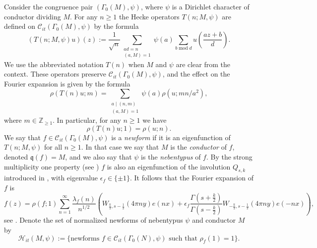 \documentclass{article}
\theoremstyle{named}
\newcommand{\C}{\mathcal{C}}
\newcommand{\HH}{\mathcal{H}}
\newcommand{\Z}{\mathbb{Z}}
\newcommand{\q}{\mathfrak{q}}
\DeclareMathOperator{\modulo}{mod}
\begin{document}
Consider the congruence pair $(\Gamma_0(M), \psi)$, where $\psi$ is a Dirichlet character of conductor dividing $M$. For any $n \geq 1$ the Hecke operators $T(n; M, \psi)$ are defined on $\C_{it}(\Gamma_0(M), \psi)$ by the formula
\begin{equation}\label{eq:Heckeoperatorsexplicitformula}
    (T(n; M, \psi)u)(z) := \frac{1}{\sqrt{n}}\sum_{\substack{ad = n\\
    (a, M) = 1}}\psi(a) \sum_{b \modulo d} u\left(\frac{az + b}{d}\right).
\end{equation}
We use the abbreviated notation $T(n)$ when $M$ and $\psi$ are clear from the context. These operators preserve $\C_{it}(\Gamma_0(M), \psi)$, and the effect on the Fourier expansion is given by the formula
\begin{equation}\label{eq:heckeandfourierexpansion}
    \rho(T(n)u; m) =\sum_{\substack{a \mid (n, m)\\ (a, M) = 1}} \psi(a) \rho(u; m n/a^2),
\end{equation}
where $m \in \Z_{\geq 1}$. In particular, for any $n \geq 1$ we have
\begin{equation*}
    \rho(T(n)u; 1) = \rho(u; n).
\end{equation*}
We say that $f \in \C_{it}(\Gamma_0(M), \psi)$ is a \emph{newform} if it is an eigenfunction of $T(n; M, \psi)$ for all $n \geq 1$. In that case we say that $M$ is the \emph{conductor} of $f$, denoted $\q(f) = M$, and we also say that $\psi$ is the \emph{nebentypus} of $f$. By the strong multiplicity one property (see \cite{piatetski_shapiro_corvallis}) $f$ is also an eigenfunction of the involution $Q_{s, k}$ introduced in \cite[Proposition 4.5]{DFIsubconvexityartin}, with eigenvalue $\epsilon_f \in \{\pm 1\}$. It follows that the Fourier expansion of $f$ is 
\begin{equation}\label{eq:fourierexpansonnewform}
    f(z) = \rho(f; 1)\sum_{n = 1}^\infty\frac{\lambda_f(n)}{n^{1/2}}\left(W_{\frac{k}{2}, s-\frac{1}{2}}(4\pi n y)e(nx) +  \epsilon_f \frac{\Gamma\left(s + \frac{k}{2}\right)}{\Gamma\left(s - \frac{k}{2}\right)}W_{-\frac{k}{2}, s-\frac{1}{2}}(4\pi n y)e(-nx)\right),
\end{equation}
see \cite[equations (4.36), (4.70)]{DFIsubconvexityartin}.
Denote the set of normalized newforms of nebentypus $\psi$ and conductor $M$ by
\begin{equation}\label{eq:setofnormalizednewforms}
        \HH_{it}(M, \psi) := \{\text{newforms }f \in \C_{it}(\Gamma_0(N), \psi) \text{ such that }\rho_f(1) = 1\}.
\end{equation}
\end{document}
